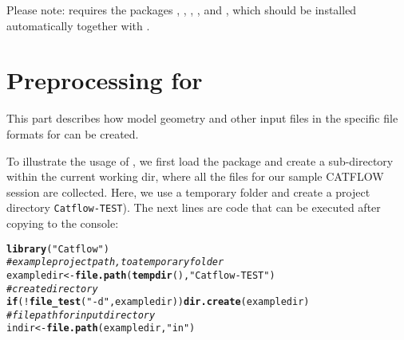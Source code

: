 \documentclass[article,nojss]{jss}\usepackage[]{graphicx}\usepackage[]{xcolor}
\makeatletter
\newcommand{\hlsng}[1]{\textcolor[rgb]{0.192,0.494,0.8}{#1}}%
\newcommand{\hlcom}[1]{\textcolor[rgb]{0.678,0.584,0.686}{\textit{#1}}}%
\newcommand{\hlopt}[1]{\textcolor[rgb]{0,0,0}{#1}}%
\newcommand{\hldef}[1]{\textcolor[rgb]{0.345,0.345,0.345}{#1}}%
\newcommand{\hlkwa}[1]{\textcolor[rgb]{0.161,0.373,0.58}{\textbf{#1}}}%
\newcommand{\hlkwb}[1]{\textcolor[rgb]{0.69,0.353,0.396}{#1}}%
\newcommand{\hlkwd}[1]{\textcolor[rgb]{0.737,0.353,0.396}{\textbf{#1}}}%
\newenvironment{kframe}{%
 \def\at@end@of@kframe{}%
 \ifinner\ifhmode%
  \def\at@end@of@kframe{\end{minipage}}%
  \begin{minipage}{\columnwidth}%
 \fi\fi%
 \def\FrameCommand##1{\hskip\@totalleftmargin \hskip-\fboxsep
 \colorbox{shadecolor}{##1}\hskip-\fboxsep
     \hskip-\linewidth \hskip-\@totalleftmargin \hskip\columnwidth}%
 \MakeFramed {\advance\hsize-\width
   \@totalleftmargin\z@ \linewidth\hsize
   \@setminipage}}%
 {\par\unskip\endMakeFramed%
 \at@end@of@kframe}
\newenvironment{knitrout}{}{} %
\makeatother
\begin{document}
Please note:  requires the packages  , , , , and , which should be installed automatically together with . 
                                       

\newpage
\part[Preprocessing for CATFLOW]{Preprocessing for }\label{sec:preproc}


This part describes how model geometry and other input files in the specific file formats for  can be created.

To illustrate the usage of , we first load the package and 
create a sub-directory within the current working dir, where all the files for our sample CATFLOW session are collected. Here, we use a temporary folder and create a project directory \verb+Catflow-TEST+). The next lines are  code that can be executed after copying to the console:
\begin{knitrout}
\color{fgcolor}\begin{kframe}
\begin{alltt}
\hlkwd{library}\hldef{(}\hlsng{"Catflow"}\hldef{)}
 \hlcom{# example project path, to a temporary folder}
\hldef{exampledir} \hlkwb{<-} \hlkwd{file.path}\hldef{(}\hlkwd{tempdir}\hldef{(),}\hlsng{"Catflow-TEST"}\hldef{)}
 \hlcom{# create directory}
\hlkwa{if}\hldef{(}\hlopt{!}\hlkwd{file_test}\hldef{(}\hlsng{"-d"}\hldef{, exampledir))} \hlkwd{dir.create}\hldef{(exampledir)}
 \hlcom{# file path for input directory}
\hldef{indir} \hlkwb{<-} \hlkwd{file.path}\hldef{(exampledir,} \hlsng{"in"}\hldef{)}
\end{alltt}
\end{kframe}
\end{knitrout}
\end{document}
